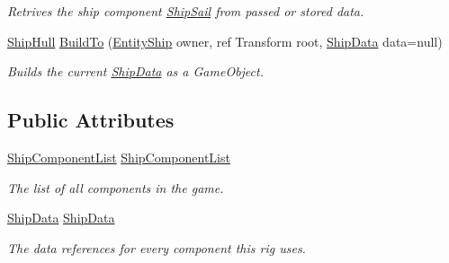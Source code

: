 \begin{DoxyCompactItemize}
\begin{DoxyCompactList}\small\item\em Retrives the ship component \hyperlink{class_skyrates_1_1_client_1_1_ship_1_1_ship_sail}{Ship\-Sail} from passed or stored data. \end{DoxyCompactList}\item 
\hyperlink{class_skyrates_1_1_client_1_1_ship_1_1_ship_hull}{Ship\-Hull} \hyperlink{class_skyrates_1_1_client_1_1_ship_1_1_ship_builder_ad04c9d770e3211b063e5a62a7972225b}{Build\-To} (\hyperlink{class_skyrates_1_1_client_1_1_entity_1_1_entity_ship}{Entity\-Ship} owner, ref Transform root, \hyperlink{class_ship_data}{Ship\-Data} data=null)
\begin{DoxyCompactList}\small\item\em Builds the current \hyperlink{class_ship_data}{Ship\-Data} as a Game\-Object. \end{DoxyCompactList}\end{DoxyCompactItemize}
\subsection*{Public Attributes}
\begin{DoxyCompactItemize}
\item 
\hyperlink{class_skyrates_1_1_client_1_1_ship_1_1_ship_component_list}{Ship\-Component\-List} \hyperlink{class_skyrates_1_1_client_1_1_ship_1_1_ship_builder_a981d21bb8a64a205825b8d50813b897e}{Ship\-Component\-List}
\begin{DoxyCompactList}\small\item\em The list of all components in the game. \end{DoxyCompactList}\item 
\hyperlink{class_ship_data}{Ship\-Data} \hyperlink{class_skyrates_1_1_client_1_1_ship_1_1_ship_builder_a14ff4eece1ec5d9bab63c8449939305c}{Ship\-Data}
\begin{DoxyCompactList}\small\item\em The data references for every component this rig uses. \end{DoxyCompactList}\end{DoxyCompactItemize}



